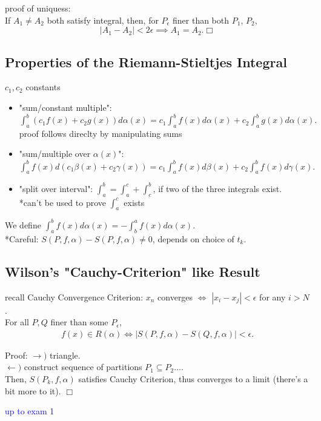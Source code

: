 \documentclass[12pt]{article}
\newcommand{\eq}[1]{\begin{align*}#1\end{align*}} %
\newcommand{\gray}[1]{\textcolor[gray]{0.5}{#1}} %
\begin{document}
{\noindent \gray{ proof of uniquess: \\
If $A_1 \neq A_2$ both satisfy integral, 
then, for $P_\epsilon$ finer than both $P_1$, $P_2$,\\
$$|A_1 - A_2 | < 2 \epsilon \implies A_1 = A_2. \Box$$
}
\subsection*{Properties of the Riemann-Stieltjes Integral}
$c_1, c_2$ constants
\begin{itemize}
    \item "sum/constant multiple": $\int_a^b (c_1 f(x) + c_2 g(x)) d \alpha(x) = c_1 \int_a^b f(x) d \alpha(x) + c_2 \int_a^b g(x) d \alpha(x).$\\
    \gray{proof follows direclty by manipulating sums}
    \item "sum/multiple over $\alpha(x)$": $\int_a^b f(x) d(c_1 \beta(x) + c_2 \gamma(x)) = c_1 \int_a^b f(x) d \beta(x) + c_2 \int_a^b f(x) d \gamma(x).$
    \item "split over interval": $\int_a^b = \int_a^c + \int_c^b$, if two of the three integrals exist.\\
    *can't be used to prove $\int_a^c$ exists
\end{itemize}

We define $\int_a^b f(x) d \alpha(x) = - \int_b^a f(x) d \alpha(x)$.\\

*Careful: $S(P, f, \alpha) - S(P, f, \alpha) \neq 0$, depends on choice of $t_k$.


\subsection*{Wilson's "Cauchy-Criterion" like Result}
\gray{recall Cauchy Convergence Criterion: $x_n$ converges $\iff$ $|x_i - x_j| < \epsilon$ for any $i > N$.}\\
For all $P, Q$ finer than some $P_\epsilon$,
\eq{f(x) \in R(\alpha) \iff |S(P, f, \alpha) - S(Q, f, \alpha)| < \epsilon.}

\gray{Proof: $\rightarrow)$ triangle. \\
$\leftarrow )$ construct sequence of partitions $P_1 \subseteq P_2 \dots$.\\
Then, $S(P_k, f, \alpha)$ satisfies Cauchy Criterion, thus converges to a limit (there's a bit more to it). $\Box$}

\textcolor{blue}{up to exam 1}

}
\end{document}
